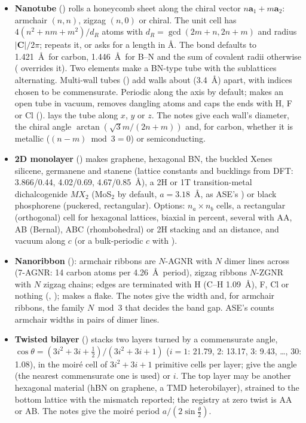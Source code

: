 \begin{itemize}
\item \textbf{Nanotube} () rolls a honeycomb sheet along the chiral vector $n\mathbf a_1 + m\mathbf a_2$: armchair $(n,n)$, zigzag $(n,0)$ or chiral. The unit cell has $4(n^2+nm+m^2)/d_R$ atoms with $d_R=\gcd(2m+n, 2n+m)$ and radius $|\mathbf C|/2\pi$;  repeats it, or  asks for a length in \AA. The bond defaults to 1.421~\AA\ for carbon, 1.446~\AA\ for B--N and the sum of covalent radii otherwise ( overrides it). Two elements make a BN-type tube with the sublattices alternating. Multi-wall tubes () add walls about  (3.4~\AA) apart, with indices chosen to be commensurate. Periodic along the axis by default;  makes an open tube in vacuum, removes dangling atoms and caps the ends with H, F or Cl ().  lays the tube along $x$, $y$ or $z$. The notes give each wall's diameter, the chiral angle $\arctan(\sqrt3 m/(2n+m))$ and, for carbon, whether it is metallic ($(n-m) \bmod 3 = 0$) or semiconducting.
\item \textbf{2D monolayer} () makes graphene, hexagonal BN, the buckled Xenes silicene, germanene and stanene (lattice constants and bucklings from DFT: 3.866/0.44, 4.02/0.69, 4.67/0.85~\AA), a 2H or 1T transition-metal dichalcogenide $MX_2$ (MoS$_2$ by default, $a = 3.18$~\AA, as ASE's ) or black phosphorene (puckered, rectangular). Options: $n_a\times n_b$ cells, a rectangular (orthogonal) cell for hexagonal lattices, biaxial  in percent, several  with AA, AB (Bernal), ABC (rhombohedral) or 2H stacking and an  distance, and vacuum along $c$ (or a bulk-periodic $c$ with ).
\item \textbf{Nanoribbon} (): armchair ribbons are $N$-AGNR with $N$ dimer lines across (7-AGNR: 14 carbon atoms per 4.26~\AA\ period), zigzag ribbons $N$-ZGNR with $N$ zigzag chains; edges are terminated with H (C--H 1.09~\AA), F, Cl or nothing (, );  makes a flake. The notes give the width and, for armchair ribbons, the family $N \bmod 3$ that decides the band gap. ASE's  counts armchair widths in pairs of dimer lines.
\item \textbf{Twisted bilayer} () stacks two layers turned by a commensurate angle, $\cos\theta = (3i^2+3i+\tfrac12)/(3i^2+3i+1)$ ($i=1$: 21.79\textdegree, 2: 13.17\textdegree, 3: 9.43\textdegree, \ldots, 30: 1.08\textdegree), in the moir\'e cell of $3i^2+3i+1$ primitive cells per layer; give the angle (the nearest commensurate one is used) or $i$. The top layer may be another hexagonal material (hBN on graphene, a TMD heterobilayer), strained to the bottom lattice with the mismatch reported; the registry at zero twist is AA or AB. The notes give the moir\'e period $a/(2\sin\frac\theta2)$.

\end{itemize}
